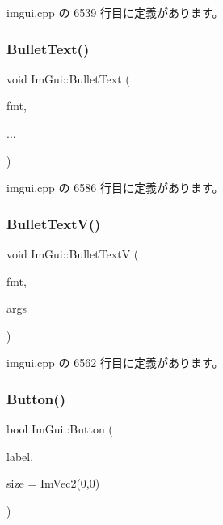  imgui.\+cpp の 6539 行目に定義があります。

\mbox{\label{namespace_im_gui_af8d34d563b17c683943a0fa7bf5807bc}} 
\subsubsection{\texorpdfstring{Bullet\+Text()}{BulletText()}}
{\footnotesize\ttfamily void Im\+Gui\+::\+Bullet\+Text (\begin{DoxyParamCaption}\item[{const char $\ast$}]{fmt,  }\item[{}]{... }\end{DoxyParamCaption})}



 imgui.\+cpp の 6586 行目に定義があります。

\mbox{\label{namespace_im_gui_af8f4b5e96c745e205974857f9a584583}} 
\subsubsection{\texorpdfstring{Bullet\+Text\+V()}{BulletTextV()}}
{\footnotesize\ttfamily void Im\+Gui\+::\+Bullet\+TextV (\begin{DoxyParamCaption}\item[{const char $\ast$}]{fmt,  }\item[{va\+\_\+list}]{args }\end{DoxyParamCaption})}



 imgui.\+cpp の 6562 行目に定義があります。

\mbox{\label{namespace_im_gui_a38094c568ce398db5a3abb9d3ac92030}} 
\subsubsection{\texorpdfstring{Button()}{Button()}}
{\footnotesize\ttfamily bool Im\+Gui\+::\+Button (\begin{DoxyParamCaption}\item[{const char $\ast$}]{label,  }\item[{const \mbox{\hyperlink{struct_im_vec2}{Im\+Vec2}} \&}]{size = {\ttfamily \mbox{\hyperlink{struct_im_vec2}{Im\+Vec2}}(0,0)} }\end{DoxyParamCaption})}




